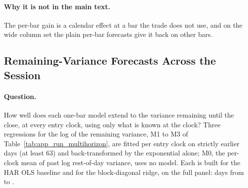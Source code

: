 \paragraph{Why it is not in the main text.} The per-bar gain is a calendar
effect at a bar the trade does not use, and on the wide column set the plain
per-bar forecasts give it back on other bars.

\subsection{Remaining-Variance Forecasts Across the Session}
\label{sec:app_run_multihorizon}

\paragraph{Question.} How well does each one-bar model extend to the variance
remaining until the close, at every entry clock, using only what is known at
the clock? Three regressions for the log of the remaining variance, M1 to M3
of Table~\ref{tab:app_run_multihorizon}, are fitted per entry clock on
strictly earlier days (at least 63) and back-transformed by the exponential
alone; M0, the per-clock mean of past log rest-of-day variance, uses no model.
Each is built for the HAR OLS
baseline and for the block-diagonal ridge, on the full panel: \runappMhDays{}
days from \runappMhFirst{} to \runappMhLast{}.

